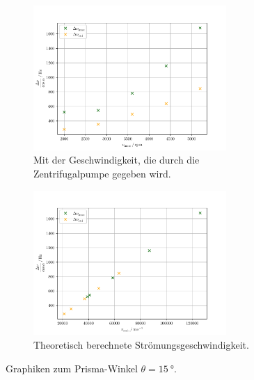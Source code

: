 \begin{figure}
    \centering
    \begin{subfigure}{0.48\textwidth}
        \centering
        \includegraphics[height=5.5cm]{plots/15_2.pdf}
        \caption{Mit der Geschwindigkeit, die durch die Zentrifugalpumpe gegeben wird.}
        \label{fig:exp15}
    \end{subfigure}
    \begin{subfigure}{0.48\textwidth}
        \centering
        \includegraphics[height=5.5cm]{plots/15_1.pdf}
        \caption{Theoretisch berechnete Strömungsgeschwindigkeit.}
        \label{fig:theo15}
    \end{subfigure}
    \caption{Graphiken zum Prisma-Winkel $\theta=\SI{15}{\degree}$.}
    \label{fig:15}
\end{figure}
